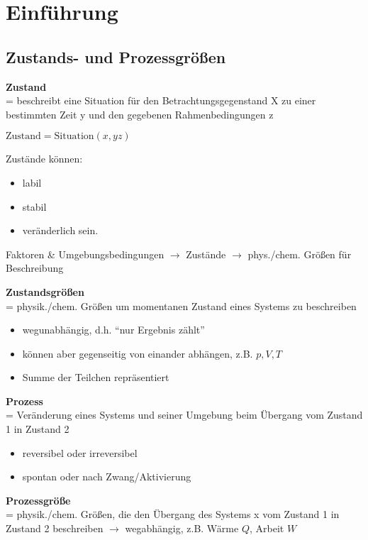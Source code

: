 \chapter{Einführung}
\section{Zustands- und Prozessgrößen}

\textbf{Zustand}\\
= beschreibt eine Situation für den Betrachtungsgegenstand X zu einer bestimmten Zeit y und den gegebenen Rahmenbedingungen z
\begin{center}
	$\text{Zustand} = \text{Situation}(x,yz)$
\end{center}
Zustände können:
\begin{itemize}
	\item  labil
	\item stabil
	\item veränderlich sein.
\end{itemize}
\begin{center}
	Faktoren \& Umgebungsbedingungen $\rightarrow$ Zustände $\rightarrow$ phys./chem. Größen für Beschreibung
\end{center}

\textbf{Zustandsgrößen}\\
= physik./chem. Größen um momentanen Zustand eines Systems zu beschreiben
\begin{itemize}
	\item wegunabhängig, d.h. "`nur Ergebnis zählt"'
	\item können aber gegenseitig von einander abhängen, z.B. $p,V,T$
	\item Summe der Teilchen repräsentiert
\end{itemize}

\textbf{Prozess}\\
= Veränderung eines Systems und seiner Umgebung beim Übergang vom Zustand 1 in Zustand 2
\begin{itemize}
	\item reversibel oder irreversibel
	\item spontan oder nach Zwang/Aktivierung
\end{itemize}

\textbf{Prozessgröße}\\
= physik./chem. Größen, die den Übergang des Systems x vom Zustand 1 in Zustand 2 beschreiben
$\rightarrow$ wegabhängig, z.B. Wärme $Q$, Arbeit $W$\\

